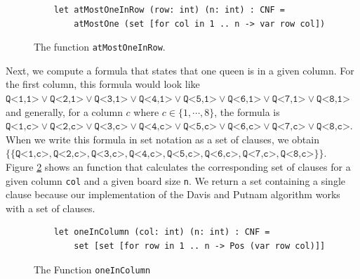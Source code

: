 \begin{figure}[!ht]
  \centering
\begin{verbatim}
    let atMostOneInRow (row: int) (n: int) : CNF =
        atMostOne (set [for col in 1 .. n -> var row col])
\end{verbatim}
\vspace*{-0.3cm}
  \caption{The function \texttt{atMostOneInRow}.}
  \label{fig:atMostOneInRow}
\end{figure}
Next, we compute a formula that states that  one queen is in a given
column. For the first column, this formula would look like
\\[0.2cm]
\hspace*{1.3cm}
$\texttt{Q<1,1>} \vee \texttt{Q<2,1>} \vee \texttt{Q<3,1>} \vee \texttt{Q<4,1>} \vee \texttt{Q<5,1>} \vee
\texttt{Q<6,1>} \vee \texttt{Q<7,1>} \vee \texttt{Q<8,1>}$
\\[0.2cm]
and generally, for a column $c$ where $c \in \{1,\cdots,8\}$, the formula is
\\[0.2cm]
\hspace*{1.3cm}
$\texttt{Q<1,c>} \vee \texttt{Q<2,c>} \vee \texttt{Q<3,c>} \vee \texttt{Q<4,c>} \vee \texttt{Q<5,c>} \vee
\texttt{Q<6,c>} \vee \texttt{Q<7,c>} \vee \texttt{Q<8,c>}$.
\\[0.2cm]
When we write this formula in set notation as a set of clauses, we obtain
\\[0.2cm]
\hspace*{1.3cm}
$\bigl\{ \{\texttt{Q<1,c>} , \texttt{Q<2,c>} , \texttt{Q<3,c>} , \texttt{Q<4,c>} , \texttt{Q<5,c>} ,
\texttt{Q<6,c>} , \texttt{Q<7,c>} , \texttt{Q<8,c>} \}\bigr\}$.
\\[0.2cm]
Figure \ref{fig:oneInColumn} shows an \Fsharp{} function that calculates the corresponding set of clauses for a given column
\texttt{col} and a given board size \texttt{n}.
We return a set containing  a single clause because our implementation of the Davis and Putnam algorithm
works with a set of clauses.

\begin{figure}[!ht]
  \centering
\begin{verbatim}
    let oneInColumn (col: int) (n: int) : CNF =
        set [set [for row in 1 .. n -> Pos (var row col)]]
\end{verbatim}
\vspace*{-0.3cm}
  \caption{The Function \texttt{oneInColumn}}
  \label{fig:oneInColumn}
\end{figure}

